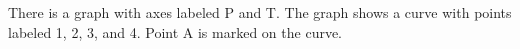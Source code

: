 There is a graph with axes labeled P and T. The graph shows a curve with points labeled 1, 2, 3, and 4. Point A is marked on the curve.